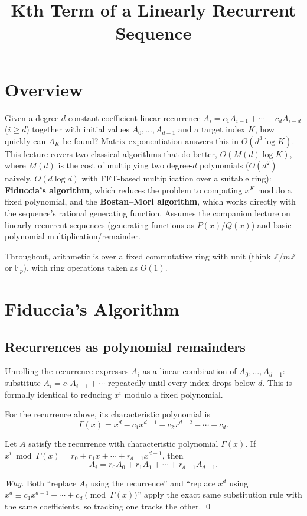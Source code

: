 \documentclass[11pt]{article}
\title{Kth Term of a Linearly Recurrent Sequence}
\author{}
\date{}
\begin{document}
\thispagestyle{fancy}


\section{Overview}
Given a degree-$d$ constant-coefficient linear recurrence
$A_i = c_1 A_{i-1} + \cdots + c_d A_{i-d}$ ($i \ge d$) together with initial
values $A_0, \ldots, A_{d-1}$ and a target index $K$, how quickly can
$A_K$ be found? Matrix exponentiation answers this in
$O(d^3 \log K)$. This lecture covers two classical algorithms that do
better, $O(M(d) \log K)$, where $M(d)$ is the cost of multiplying two
degree-$d$ polynomials ($O(d^2)$ naively, $O(d \log d)$ with FFT-based
multiplication over a suitable ring): \textbf{Fiduccia's algorithm}, which
reduces the problem to computing $x^K$ modulo a fixed polynomial, and the
\textbf{Bostan--Mori algorithm}, which works directly with the sequence's
rational generating function. Assumes the companion lecture on linearly
recurrent sequences (generating functions as $P(x)/Q(x)$) and basic
polynomial multiplication/remainder.

Throughout, arithmetic is over a fixed commutative ring with unit
(think $\mathbb{Z}/m\mathbb{Z}$ or $\mathbb{F}_p$), with ring operations
taken as $O(1)$.

\section{Fiduccia's Algorithm}

\subsection{Recurrences as polynomial remainders}
Unrolling the recurrence expresses $A_i$ as a linear combination of
$A_0, \ldots, A_{d-1}$: substitute $A_{i} = c_1 A_{i-1} + \cdots$
repeatedly until every index drops below $d$. This is formally identical
to reducing $x^i$ modulo a fixed polynomial.

\begin{definitionbox}
For the recurrence above, its characteristic polynomial is
\[
  \Gamma(x) = x^d - c_1 x^{d-1} - c_2 x^{d-2} - \cdots - c_d .
\]
\end{definitionbox}

\begin{theorembox}
Let $A$ satisfy the recurrence with characteristic polynomial $\Gamma(x)$.
If $x^i \bmod \Gamma(x) = r_0 + r_1 x + \cdots + r_{d-1}x^{d-1}$, then
\[
  A_i = r_0 A_0 + r_1 A_1 + \cdots + r_{d-1} A_{d-1}.
\]

\emph{Why.} Both ``replace $A_i$ using the recurrence'' and ``replace
$x^d$ using $x^d \equiv c_1 x^{d-1} + \cdots + c_d \pmod{\Gamma(x)}$''
apply the exact same substitution rule with the same coefficients, so
tracking one tracks the other. \qed
\end{theorembox}
\end{document}
